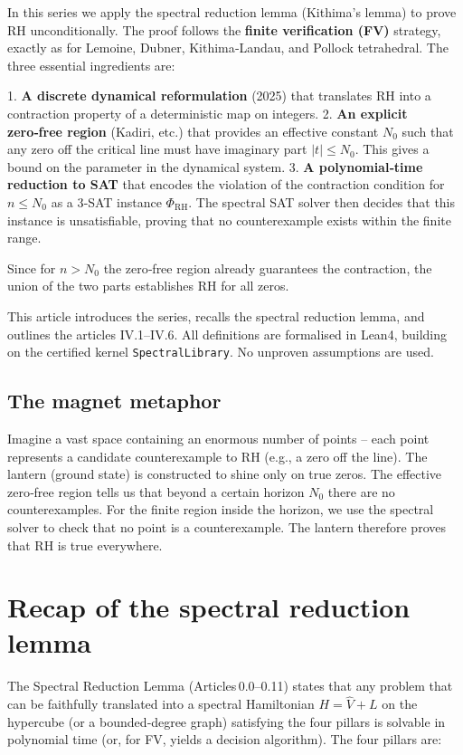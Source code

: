 \documentclass[11pt,a4paper]{article}
\begin{document}
In this series we apply the spectral reduction lemma (Kithima's lemma) to prove RH unconditionally. The proof follows the \textbf{finite verification (FV)} strategy, exactly as for Lemoine, Dubner, Kithima‑Landau, and Pollock tetrahedral. The three essential ingredients are:

1. \textbf{A discrete dynamical reformulation} (2025) that translates RH into a contraction property of a deterministic map on integers.
2. \textbf{An explicit zero‑free region} (Kadiri, etc.) that provides an effective constant \(N_0\) such that any zero off the critical line must have imaginary part \(|t| \le N_0\). This gives a bound on the parameter in the dynamical system.
3. \textbf{A polynomial‑time reduction to SAT} that encodes the violation of the contraction condition for \(n \le N_0\) as a 3‑SAT instance \(\Phi_{\text{RH}}\). The spectral SAT solver then decides that this instance is unsatisfiable, proving that no counterexample exists within the finite range.

Since for \(n > N_0\) the zero‑free region already guarantees the contraction, the union of the two parts establishes RH for all zeros.

This article introduces the series, recalls the spectral reduction lemma, and outlines the articles IV.1–IV.6. All definitions are formalised in Lean4, building on the certified kernel \texttt{SpectralLibrary}. No unproven assumptions are used.

\subsection{The magnet metaphor}

Imagine a vast space containing an enormous number of points – each point represents a candidate counterexample to RH (e.g., a zero off the line). The lantern (ground state) is constructed to shine only on true zeros. The effective zero‑free region tells us that beyond a certain horizon \(N_0\) there are no counterexamples. For the finite region inside the horizon, we use the spectral solver to check that no point is a counterexample. The lantern therefore proves that RH is true everywhere.

\section{Recap of the spectral reduction lemma}

The Spectral Reduction Lemma (Articles 0.0–0.11) states that any problem that can be faithfully translated into a spectral Hamiltonian \(H = \hat{V} + L\) on the hypercube (or a bounded‑degree graph) satisfying the four pillars is solvable in polynomial time (or, for FV, yields a decision algorithm). The four pillars are:
\end{document}
